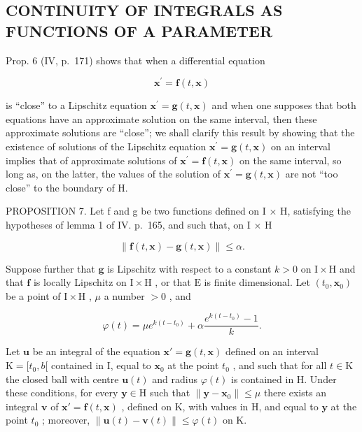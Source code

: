 \subsection{CONTINUITY OF INTEGRALS AS FUNCTIONS OF A PARAMETER}

Prop. 6 (IV, p.~171) shows that when a differential equation

\[
\mathbf {x} ^ {\prime} = \mathbf {f} (t, \mathbf {x})
\]

is ``close'' to a Lipschitz equation \(\mathbf{x}^{\prime} = \mathbf{g}(t, \mathbf{x})\) and when one supposes that both equations have an approximate solution on the same interval, then these approximate solutions are ``close''; we shall clarify this result by showing that the existence of solutions of the Lipschitz equation \(\mathbf{x}^{\prime} = \mathbf{g}(t, \mathbf{x})\) on an interval implies that of approximate solutions of \(\mathbf{x}^{\prime} = \mathbf{f}(t, \mathbf{x})\) on the same interval, so long as, on the latter, the values of the solution of \(\mathbf{x}^{\prime} = \mathbf{g}(t, \mathbf{x})\) are not ``too close'' to the boundary of H.

PROPOSITION 7. Let f and g be two functions defined on I × H, satisfying the hypotheses of lemma 1 of IV. p.~165, and such that, on I × H

\[
\left\| \mathbf {f} (t, \mathbf {x}) - \mathbf {g} (t, \mathbf {x}) \right\| \leqslant \alpha .\tag{16}
\]

Suppose further that \(\mathbf{g}\) is Lipschitz with respect to a constant \(k > 0\) on \(\mathrm{I} \times \mathrm{H}\) and that \(\mathbf{f}\) is locally Lipschitz on \(\mathrm{I} \times \mathrm{H}\) , or that \(\mathrm{E}\) is finite dimensional. Let \((t_0, \mathbf{x}_0)\) be a point of \(\mathrm{I} \times \mathrm{H}\) , \(\mu\) a number \(>0\) , and

\[
\varphi (t) = \mu e ^ {k (t - t _ {0})} + \alpha \frac {e ^ {k (t - t _ {0})} - 1}{k}.
\]

Let \(\mathbf{u}\) be an integral of the equation \(\mathbf{x}' = \mathbf{g}(t, \mathbf{x})\) defined on an interval \(\mathrm{K} = [t_0, b[\) contained in I, equal to \(\mathbf{x}_0\) at the point \(t_0\) , and such that for all \(t \in \mathrm{K}\) the closed ball with centre \(\mathbf{u}(t)\) and radius \(\varphi(t)\) is contained in H. Under these conditions, for every \(\mathbf{y} \in \mathrm{H}\) such that \(\| \mathbf{y} - \mathbf{x}_0 \| \leqslant \mu\) there exists an integral \(\mathbf{v}\) of \(\mathbf{x}' = \mathbf{f}(t, \mathbf{x})\) , defined on K, with values in H, and equal to \(\mathbf{y}\) at the point \(t_0\) ; moreover, \(\| \mathbf{u}(t) - \mathbf{v}(t) \| \leqslant \varphi(t)\) on K.

